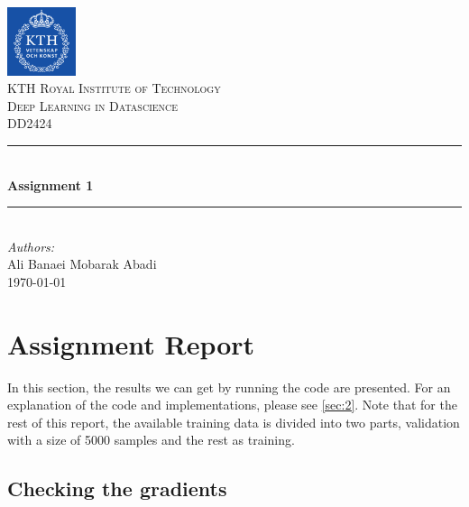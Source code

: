 \documentclass[a4paper]{article}
\begin{document}
\begin{titlepage}

\newcommand{\HRule}{\rule{\linewidth}{0.5mm}} 							%
\center 
 
 

\includegraphics[width=0.15\textwidth]{images/kth_logo.png}\\[0.5cm] 	%

\textsc{\LARGE KTH Royal Institute of Technology}\\[1cm]

\textsc{\Large Deep Learning in Datascience}\\[0.2cm]
\textsc{\large DD2424}\\[1cm] 										%
\HRule \\[0.8cm]
{ \huge \bfseries Assignment 1}\\[0.7cm]								%
\HRule \\[2cm]
\large
\emph{Authors:}\\
Ali Banaei Mobarak Abadi\\[1.5cm]													%
{\large \today}\\[5cm]

\vfill 
\end{titlepage}


\section{Assignment Report}
In this section, the results we can get by running the code are presented. For an explanation of the code and implementations, please see \autoref{sec:2}. Note that for the rest of this report, the available training data is divided into two parts, validation with a size of 5000 samples and the rest as training.

\subsection{Checking the gradients}
\end{document}
